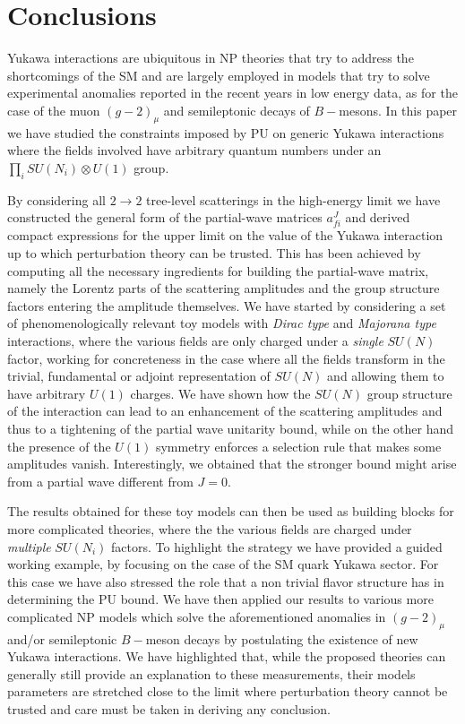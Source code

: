 \documentclass[a4paper,11pt]{article}
\begin{document}


\section{Conclusions}\label{sec:conc}

Yukawa interactions are ubiquitous in NP theories that try to address the shortcomings of the SM and are largely employed in models that try to solve experimental anomalies reported in the recent years in low energy data, as for the case of the muon $(g-2)_\mu$ and semileptonic decays of $B-$mesons. In this paper we have studied the constraints imposed by 
 PU  on generic Yukawa interactions where the fields involved have arbitrary  quantum numbers under an $\prod_i SU(N_i) \otimes U(1)$ group.  
 
 By considering all $2\to 2$ tree-level scatterings in the high-energy limit we have constructed the general form of the partial-wave matrices 
$a^J_{fi}$ and derived compact expressions for the upper limit on the value of the Yukawa interaction up to which perturbation theory can be trusted. 
This has been achieved by computing all the necessary ingredients for building the partial-wave matrix, namely the Lorentz parts of the scattering amplitudes and the group structure factors entering the amplitude themselves. We have started by considering a set of 
phenomenologically relevant toy models with {\emph{Dirac type}} and {\emph{Majorana type}} interactions, where the various fields are only charged under a {\emph{single}}  $SU(N)$ factor, working for concreteness in the case where all the fields transform in the trivial, fundamental or adjoint representation of $SU(N)$ and allowing them to have arbitrary $U(1)$ charges. We have shown how the $SU(N)$ group structure of the interaction can lead to an 
enhancement of the scattering amplitudes  and thus to a tightening of the partial wave unitarity bound, while on the other hand the presence of the $U(1)$ symmetry enforces a selection rule that makes some amplitudes vanish. Interestingly, we obtained that the stronger bound might arise from a partial wave different from $J=0$.

The results obtained for these toy models can then be used as building blocks for more complicated theories, where the the various fields are charged under {\emph{multiple}} $SU(N_i)$ factors. To highlight the strategy we have provided a guided working example, by focusing on the case of the SM quark Yukawa sector. For this case we have also stressed the role that a non trivial flavor structure has in determining the PU bound.  We have then applied our results to various more complicated NP models which solve the aforementioned anomalies in $(g-2)_\mu$ and/or semileptonic $B-$meson decays by postulating 
the existence of new Yukawa interactions. We have highlighted that,
while the proposed theories 
can generally still provide an explanation to these measurements, their models parameters are stretched close to the limit where perturbation theory cannot be trusted and care must be taken in deriving any conclusion.
\end{document}
